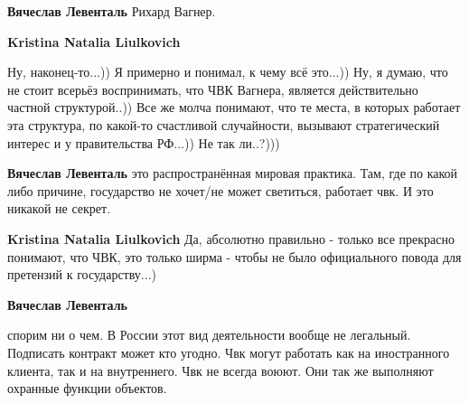 \begin{itemize}
\begin{itemize}
\textbf{Вячеслав Левенталь} Рихард Вагнер.

 
\textbf{Kristina Natalia Liulkovich} 

Ну, наконец-то...)) Я примерно и понимал, к чему всё это...)) Ну, я думаю, что
не стоит всерьёз воспринимать, что ЧВК Вагнера, является действительно частной
структурой..)) Все же молча понимают, что те места, в которых работает эта
структура, по какой-то счастливой случайности, вызывают стратегический интерес
и у правительства РФ...)) Не так ли..?)))


 
\textbf{Вячеслав Левенталь} это распространённая мировая практика. Там, где по
какой либо причине, государство не хочет/не может светиться, работает чвк. И
это никакой не секрет.

 
\textbf{Kristina Natalia Liulkovich} Да, абсолютно правильно - только все прекрасно понимают, что ЧВК, это только ширма - чтобы не было официального повода для претензий к государству...)

 
\textbf{Вячеслав Левенталь} 

спорим ни о чем. В России этот вид деятельности вообще не легальный. Подписать
контракт может кто угодно. Чвк могут работать как на иностранного клиента, так
и на внутреннего. Чвк не всегда воюют. Они так же выполняют охранные функции
объектов.


\end{itemize}
\end{itemize}
